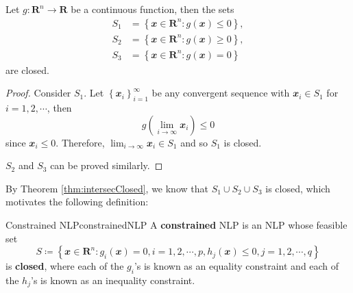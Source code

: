 \documentclass[math]{amznotes}
\theoremstyle{remark}
\begin{document}
\begin{thmbox}{}{}
    Let $g \colon \mathbf{R}^n \to \mathbf{R}$ be a continuous function, then the sets
    \begin{align*}
        S_1 & = \left\{\mathbfit{x} \in \mathbf{R}^n \colon g(\mathbfit{x}) \leq 0\right\}, \\
        S_2 & = \left\{\mathbfit{x} \in \mathbf{R}^n \colon g(\mathbfit{x}) \geq 0\right\}, \\
        S_3 & = \left\{\mathbfit{x} \in \mathbf{R}^n \colon g(\mathbfit{x}) = 0\right\}
    \end{align*}
    are closed.
    \tcblower
    \begin{proof}
        Consider $S_1$. Let $\left\{\mathbfit{x}_i\right\}_{i = 1}^\infty$ be any convergent sequence with $\mathbfit{x}_i \in S_1$ for $i = 1, 2, \cdots$, then
        \begin{equation*}
            g\left(\lim_{i \to \infty}\mathbfit{x}_i\right) \leq 0
        \end{equation*}
        since $\mathbfit{x}_i \leq 0$. Therefore, $\lim_{i \to \infty}\mathbfit{x}_i \in S_1$ and so $S_1$ is closed.

        $S_2$ and $S_3$ can be proved similarly.
    \end{proof}
\end{thmbox}
By Theorem \ref{thm:intersecClosed}, we know that $S_1 \cup S_2 \cup S_3$ is closed, which motivates the following definition:
\begin{dfnbox}{Constrained NLP}{constrainedNLP}
    A {\color{red} \textbf{constrained}} NLP is an NLP whose feasible set
    \begin{displaymath}
        S \coloneqq \left\{\mathbfit{x} \in \mathbf{R}^n \colon g_i(\mathbfit{x}) = 0, i = 1, 2, \cdots, p, h_j(\mathbfit{x}) \leq 0, j = 1, 2, \cdots, q\right\}
    \end{displaymath}
    is {\color{red} \textbf{closed}}, where each of the $g_i$'s is known as an equality constraint and each of the $h_j$'s is known as an inequality constraint.
\end{dfnbox}
\end{document}
